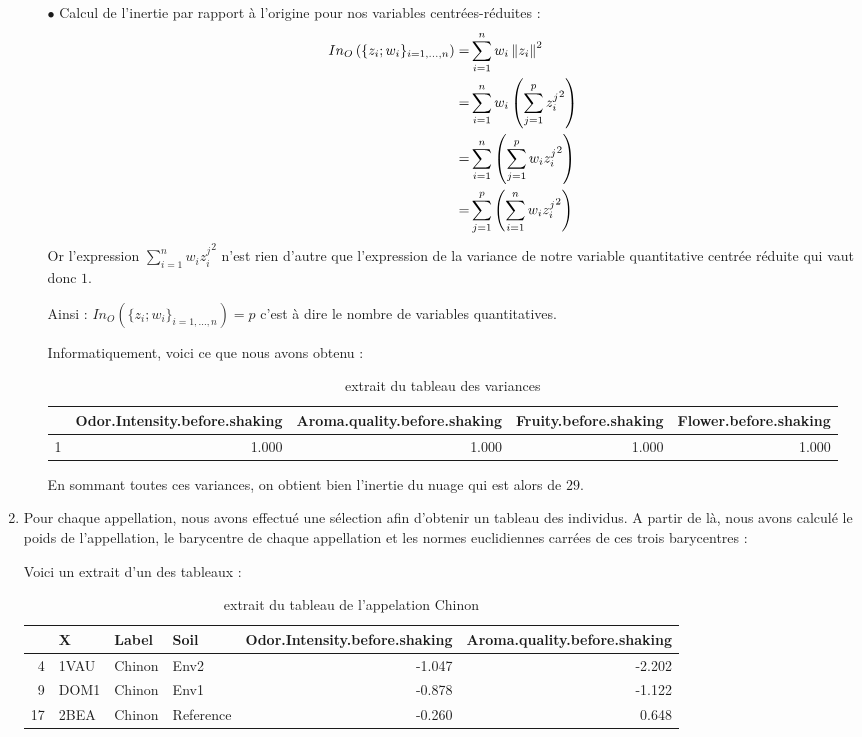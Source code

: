 \documentclass{article}
\begin{document}
\begin{enumerate}
\begin{itemize}
    \item[$\bullet$] Calcul de l'inertie  par rapport à l'origine pour nos variables centrées-réduites : 
    \begin{align*}
       In_{O}\left(\{z_i;w_i\}_{i=1,...,n}\right) = & \sum_{i=1}^{n} w_i \left\| z_{i}\right\|^2 \\
       = & \sum_{i=1}^{n} w_i \left(\sum_{j=1}^p {z_i^j}^2\right)\\
       =& \sum_{i=1}^{n} \left(\sum_{j=1}^p w_i {z_i^j}^2\right) \\
       =& \sum_{j=1}^p \left( \sum_{i=1}^{n}w_i {z_i^j}^2\right)
    \end{align*}
    Or l'expression $\displaystyle \sum_{i=1}^{n}w_i {z_i^j}^2$ n'est rien d'autre que l'expression de la variance de notre variable quantitative centrée réduite qui vaut donc $1$. 

    Ainsi : $In_{O}\left(\{z_i;w_i\}_{i=1,...,n}\right) = p$ c'est à dire le nombre de variables quantitatives.
    
    Informatiquement, voici ce que nous avons obtenu : 

\begin{center}
 \begin{table}[ht]
\centering
\begin{tabular}{rrrrr}
  \hline
 & Odor.Intensity.before.shaking & Aroma.quality.before.shaking & Fruity.before.shaking & Flower.before.shaking \\ 
  \hline
1 & 1.000 & 1.000 & 1.000 & 1.000 \\ 
   \hline
\end{tabular}
\caption{extrait du tableau des variances} 
\end{table} 
 \end{center} 

En sommant toutes ces variances, on obtient bien l'inertie du nuage qui est alors de $29$.  
    \end{itemize}

\item Pour chaque appellation, nous avons effectué une sélection afin d'obtenir un tableau des individus. A partir de là, nous avons calculé le poids de l'appellation, le barycentre de chaque appellation et les normes euclidiennes carrées de ces trois barycentres : 

Voici un extrait d'un des tableaux : 

\begin{center}
\begin{table}[ht]
\centering
\begin{tabular}{rlllrr}
  \hline
 & X & Label & Soil & Odor.Intensity.before.shaking & Aroma.quality.before.shaking \\ 
  \hline
4 & 1VAU & Chinon & Env2 & -1.047 & -2.202 \\ 
  9 & DOM1 & Chinon & Env1 & -0.878 & -1.122 \\ 
  17 & 2BEA & Chinon & Reference & -0.260 & 0.648 \\ 
   \hline
\end{tabular}
\caption{extrait du tableau de l'appelation Chinon} 
\end{table}
\end{center}


\end{enumerate}
\end{document}
